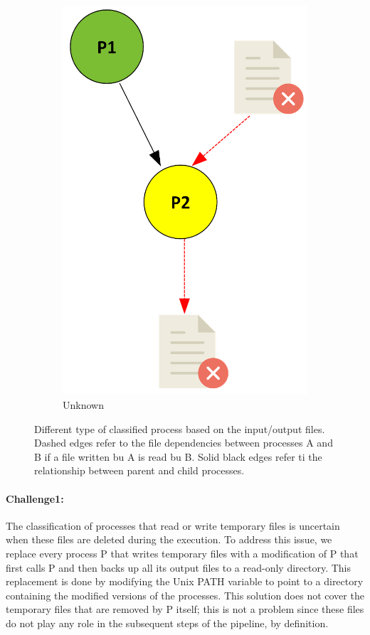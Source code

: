 \documentclass{article}
\begin{document}
\begin{figure}[H]
\begin{subfigure}{0.15\textwidth}
    \includegraphics[scale=0.35]{images/yellow.png}
    \caption{Unknown}
    \label{fig:yellow}
\end{subfigure}
    \caption{Different type of classified process based on the input/output files.
  Dashed edges refer to the file dependencies between processes A and B if a file written bu A is read bu B.
  Solid black edges refer ti the relationship between parent and child processes.}
    \label{fig:processes}
\end{figure}

\paragraph{Challenge1:} The classification of processes that read or write temporary files is 
uncertain when these files are deleted during the execution. To address 
this issue, we replace every process P that writes temporary files with 
a modification of P that first calls P and then backs up all its output 
files to a read-only directory. This replacement is done by modifying 
the Unix PATH variable to point to a directory containing the modified
versions of the processes. This solution does not cover the temporary files
that are removed by P itself; this is not a problem since these files do not
play any role in the subsequent steps of the pipeline, by definition.
\end{document}
